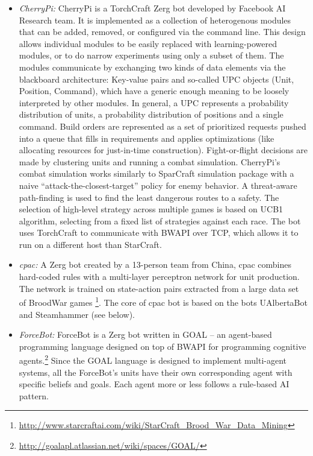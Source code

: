 \begin{itemize}
  \setlength\itemsep{1em}
  
  
  \item {\em CherryPi:} CherryPi is a TorchCraft \cite{synnaeve2016torchcraft} Zerg bot developed by Facebook AI Research team. 
  It is implemented as a collection of heterogenous modules that can be added, removed, or configured via the command line. This design allows individual modules to be easily replaced with learning-powered modules, or to do narrow experiments using only a subset of them. The modules communicate by exchanging two kinds of data elements via the blackboard architecture: Key-value pairs and so-called UPC objects (Unit, Position, Command), which have a generic enough meaning to be loosely interpreted by other modules. In general, a UPC represents a probability distribution of units, a probability distribution of positions and a single command. Build orders are represented as a set of prioritized requests pushed into a queue that fills in requirements and applies optimizations (like allocating resources for just-in-time construction). Fight-or-flight decisions are made by clustering units and running a combat simulation. CherryPi's combat simulation works similarly to SparCraft simulation package with a naive ``attack-the-closest-target'' policy for enemy behavior. A threat-aware path-finding is used to find the least dangerous routes to a safety. The selection of high-level strategy across multiple games is based on UCB1 algorithm, selecting from a fixed list of strategies against each race. The bot uses TorchCraft to communicate with BWAPI over TCP, which allows it to run on a different host than StarCraft.
  
  \item {\em cpac:} A Zerg bot created by a 13-person team from China, cpac combines hard-coded rules with a multi-layer perceptron network for unit production. The network is trained on state-action pairs extracted from a large data set of BroodWar games \footnote{\url{http://www.starcraftai.com/wiki/StarCraft_Brood_War_Data_Mining}}. The core of cpac bot is based on the bots UAlbertaBot and Steamhammer (see below).
  
  \item {\em ForceBot:} ForceBot is a Zerg bot written in GOAL -- an agent-based programming language designed on top of BWAPI for programming cognitive agents.\footnote{\url{http://goalapl.atlassian.net/wiki/spaces/GOAL/}} Since the GOAL language is designed to implement multi-agent systems, all the ForceBot's units have their own corresponding agent with specific beliefs and goals. Each agent more or less follows a rule-based AI pattern.  
  

\end{itemize}
